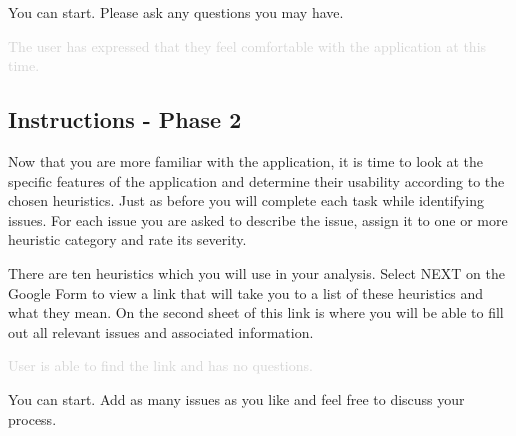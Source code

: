 \documentclass[a4 paper, 10pt]{article}
\begin{document}
        \begin{itshape}
            You can start. Please ask any questions you may have.
        \end{itshape}

        \textcolor{lightgray}{The user has expressed that they feel comfortable with the application at this time.}
    
    \subsection*{Instructions - Phase 2}
        \begin{itshape}    
            Now that you are more familiar with the application, it is time to look at the specific features of the application and determine their usability according to the chosen heuristics. Just as before you will complete each task while identifying issues.  For each issue you are asked to describe the issue, assign it to one or more heuristic category and rate its severity. 
            
            There are ten heuristics which you will use in your analysis. Select NEXT on the Google Form to view a link that will take you to a list of these heuristics and what they mean. On the second sheet of this link is where you will be able to fill out all relevant issues and associated information. 

            \textcolor{lightgray}{User is able to find the link and has no questions.}

            You can start. Add as many issues as you like and feel free to discuss your process.
        \end{itshape} 
    
\end{document}
